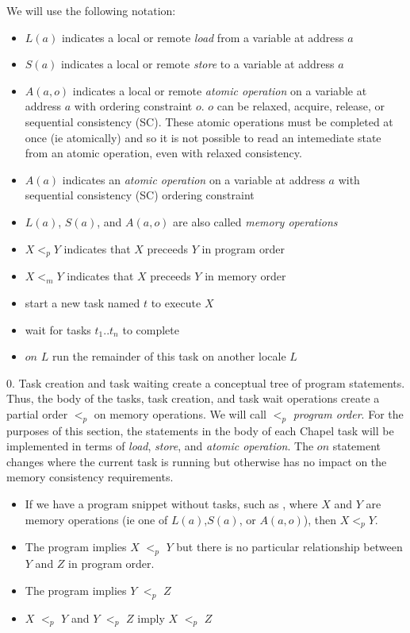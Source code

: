 We will use the following notation:
\begin{itemize}
  \item $L(a)$ indicates a local or remote \textit{load} from a variable at address $a$
  \item $S(a)$ indicates a local or remote \textit{store} to a variable at address $a$
  \item $A(a,o)$ indicates a local or remote \textit{atomic operation} on a variable at address $a$ with ordering constraint $o$. $o$ can be relaxed, acquire, release, or sequential consistency (SC). These atomic operations must be completed at once (ie atomically) and so it is not possible to read an intemediate state from an atomic operation, even with relaxed consistency. 
  \item $A(a)$ indicates an \textit{atomic operation} on a variable at address $a$ with sequential consistency (SC) ordering constraint
  \item $L(a)$, $S(a)$, and $A(a,o)$ are also called \textit{memory operations}
  \item $X <_p Y$ indicates that $X$ preceeds $Y$ in program order
  \item $X <_m Y$ indicates that $X$ preceeds $Y$ in memory order
  \item {} start a new task named $t$ to execute $X$
  \item {} wait for tasks $t_1..t_n$ to complete
  \item $on$ $L$ run the remainder of this task on another locale $L$
\end{itemize}

0. Task creation and task waiting create a conceptual tree of program
statements. Thus, the body of the tasks, task creation, and task wait
operations create a partial order $<_p$ on memory operations. We will call
$<_p$ \textit{program order}. For the purposes of this section, the statements
in the body of each Chapel task will be implemented in terms of \textit{load},
\textit{store}, and \textit{atomic operation}. The $on$ statement changes where
the current task is running but otherwise has no impact on the memory
consistency requirements.

\begin{itemize}
  \item If we have a program snippet without tasks, such as , where $X$ and $Y$ are memory operations (ie one of $L(a)$,$S(a)$, or $A(a,o)$), then $X <_p Y$.
  \item The program  implies $X$ $<_p$ $Y$ but there is no particular relationship between $Y$ and $Z$ in program order.
  \item The program  implies $Y$ $<_p$ $Z$
  \item $X$ $<_p$ $Y$ and $Y$ $<_p$ $Z$ imply $X$ $<_p$ $Z$
\end{itemize}

